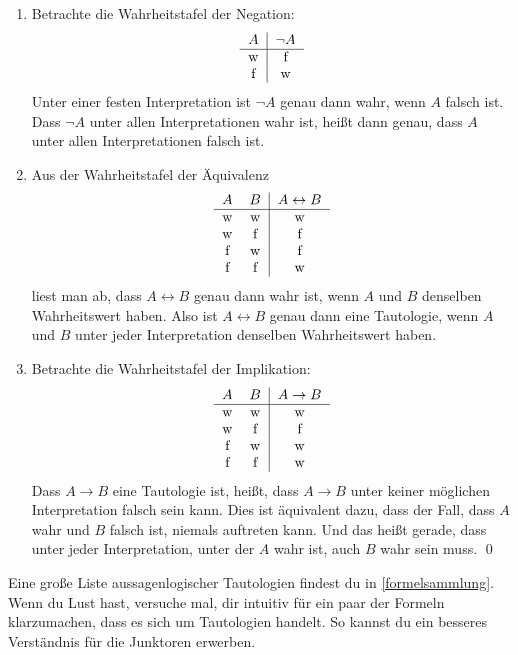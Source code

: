 \begin{bew}
    \begin{enumerate}
        \item Betrachte die Wahrheitstafel der Negation:
        \[\begin{tabular}{c|c}
            $A$ &  $\neg A$ \\
            \hline
            w&f\\
            f&w
        \end{tabular}\]
        Unter einer festen Interpretation ist $\neg A$ genau dann wahr, wenn $A$ falsch ist. Dass $\neg A$ unter allen Interpretationen wahr ist, heißt dann genau, dass $A$ unter allen Interpretationen falsch ist.
        \item Aus der Wahrheitstafel der Äquivalenz
        \[\begin{tabular}{cc|c}
            $A$ &  $B$ & $A \leftrightarrow B$ \\
            \hline
            w&w&w\\
            w&f&f \\
            f & w & f\\
            f & f & w
        \end{tabular}\]
        liest man ab, dass $A\leftrightarrow B$ genau dann wahr ist, wenn $A$ und $B$ denselben Wahrheitswert haben. Also ist $A\leftrightarrow B$ genau dann eine Tautologie, wenn $A$ und $B$ unter jeder Interpretation denselben Wahrheitswert haben.
        \item Betrachte die Wahrheitstafel der Implikation:
        \[\begin{tabular}{cc|c}
            $A$ &  $B$ & $A \to B$ \\
            \hline
            w&w&w\\
            w&f&f \\
            f & w & w\\
            f & f & w
        \end{tabular}\]
        Dass $A\to B$ eine Tautologie ist, heißt, dass $A\to B$ unter keiner möglichen Interpretation falsch sein kann. Dies ist äquivalent dazu, dass der Fall, dass $A$ wahr und $B$ falsch ist, niemals auftreten kann. Und das heißt gerade, dass unter jeder Interpretation, unter der $A$ wahr ist, auch $B$ wahr sein muss. \qed
    \end{enumerate}
\end{bew}
 

\begin{bem}
    Eine große Liste aussagenlogischer Tautologien findest du in \cref{formelsammlung}. Wenn du Lust hast, versuche mal, dir intuitiv für ein paar der Formeln klarzumachen, dass es sich um Tautologien handelt. So kannst du ein besseres Verständnis für die Junktoren erwerben.
\end{bem}



